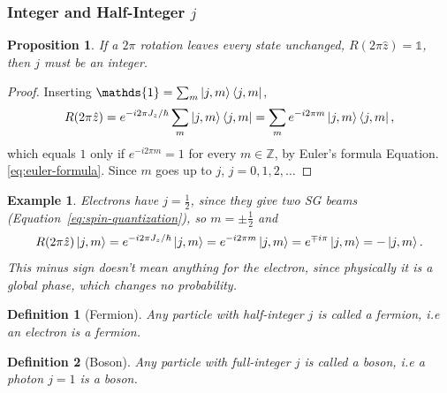 \documentclass{article}
\newtheorem{definition}{Definition}
\newtheorem*{example}{Example}
\newtheorem{proposition}{Proposition}
\newcommand{\id}{\mathds{1}}
\begin{document}
\subsubsection{Integer and Half-Integer $j$}
\begin{proposition}
    If a $2\pi$ rotation leaves every state unchanged, $R(2\pi\hat{z}) = \id$, then $j$ must be an integer.
\end{proposition}
\begin{proof}
    Inserting $\id = \sum_m \ket{j,m}\bra{j,m}$,
    \begin{equation*}
        R(2\pi\hat{z}) = e^{-i2\pi J_z/\hbar}\sum_m \ket{j,m}\bra{j,m} = \sum_m e^{-i2\pi m}\ket{j,m}\bra{j,m},
    \end{equation*}
    which equals $1$ only if $e^{-i2\pi m} = 1$ for every $m\in\mathbb{Z}$, by Euler's formula Equation.\eqref{eq:euler-formula}. Since $m$ goes up to $j$, $j = 0, 1, 2, \ldots$
\end{proof}
\begin{example}
    Electrons have $j = \frac{1}{2}$, since they give two SG beams (Equation~\eqref{eq:spin-quantization}), so $m = \pm\frac{1}{2}$ and
    \begin{equation*}
        R(2\pi\hat{z})\ket{j,m} = e^{-i2\pi J_z/\hbar}\ket{j,m} = e^{-i2\pi m}\ket{j,m} = e^{\mp i\pi}\ket{j,m} = -\ket{j,m}.
    \end{equation*}
    This minus sign doesn't mean anything for the electron, since physically it is a global phase, which changes no probability.
\end{example}
\begin{definition}[Fermion]
    Any particle with half-integer $j$ is called a fermion, i.e an electron is a fermion.
\end{definition}
\begin{definition}[Boson]
    Any particle with full-integer $j$ is called a boson, i.e a photon $j=1$ is a boson.
\end{definition}
\end{document}
